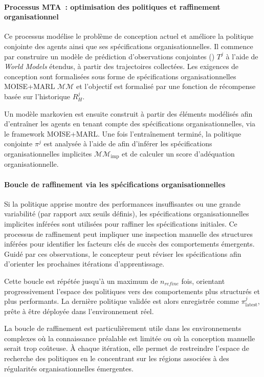 \paragraph{Processus MTA~: optimisation des politiques et raffinement organisationnel}

Ce processus modélise le problème de conception actuel et améliore la politique conjointe des agents ainsi que ses spécifications organisationnelles. Il commence par construire un modèle de prédiction d'observations conjointes () $T^j$ à l'aide de \textit{World Models} étendus, à partir des trajectoires collectées. Les exigences de conception sont formalisées sous forme de spécifications organisationnelles MOISE+MARL $\mathcal{MM}$ et l'objectif est formalisé par une fonction de récompense basée sur l'historique $R^j_H$.

Un modèle markovien est ensuite construit à partir des éléments modélisés afin d'entraîner les agents en tenant compte des spécifications organisationnelles, via le framework MOISE+MARL. Une fois l'entraînement terminé, la politique conjointe $\pi^j$ est analysée à l'aide de  afin d'inférer les spécifications organisationnelles implicites $\mathcal{MM}_{\text{imp}}$ et de calculer un score d'adéquation organisationnelle.

\paragraph{Boucle de raffinement via les spécifications organisationnelles}

Si la politique apprise montre des performances insuffisantes ou une grande variabilité (par rapport aux seuils définis), les spécifications organisationnelles implicites inférées sont utilisées pour raffiner les spécifications initiales. Ce processus de raffinement peut impliquer une inspection manuelle des structures inférées pour identifier les facteurs clés de succès des comportements émergents. Guidé par ces observations, le concepteur peut réviser les spécifications afin d'orienter les prochaines itérations d'apprentissage.

Cette boucle est répétée jusqu'à un maximum de $n_{refine}$ fois, orientant progressivement l'espace des politiques vers des comportements plus structurés et plus performants. La dernière politique validée est alors enregistrée comme $\pi^j_{\text{latest}}$, prête à être déployée dans l'environnement réel.

La boucle de raffinement est particulièrement utile dans les environnements complexes où la connaissance préalable est limitée ou où la conception manuelle serait trop coûteuse. À chaque itération, elle permet de restreindre l'espace de recherche des politiques en le concentrant sur les régions associées à des régularités organisationnelles émergentes.

